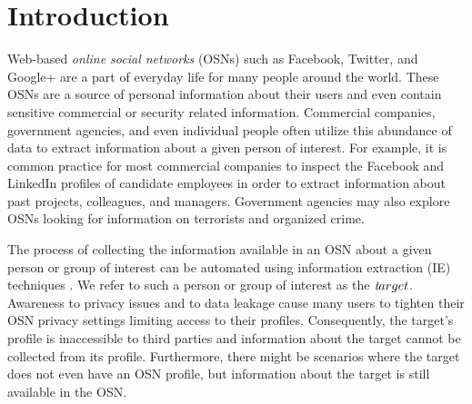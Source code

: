 \documentclass[prodmode,acmtecs]{acmsmall} %
\newcommand{\note}[2]{\textbf{\textsc{#1} says: \textit{#2}}}
\newcommand{\target}{{\textit target}}
\begin{document}
\begin{abstract}

\end{abstract}

\maketitle

\section{Introduction}

Web-based {\em online social networks} (OSNs) such as Facebook, Twitter, and Google+ are a part of everyday life for many people around the world. These OSNs are a source of personal information about their users and even contain sensitive commercial or security related information. Commercial companies, government agencies, and even individual people often utilize this abundance of data to extract information about a given person of interest. For example, it is common practice for most commercial companies to inspect the Facebook and LinkedIn profiles of candidate employees in order to extract information about past projects, colleagues, and managers. Government agencies may also explore OSNs looking for information on terrorists and organized crime. 

The process of collecting the information available in an OSN 
about a given person or group of interest can be automated using information extraction (IE) techniques \cite{chang2006survey}. We refer to such a person or group of interest as the $\target$. 
Awareness to privacy issues and to data leakage cause many users to tighten their OSN privacy settings limiting access to their profiles. Consequently, the target's profile is inaccessible to third parties and information about the target cannot be collected from its profile. Furthermore, there might be scenarios where the target does not even have an OSN profile, but information about the target is still available in the OSN.
\end{document}
